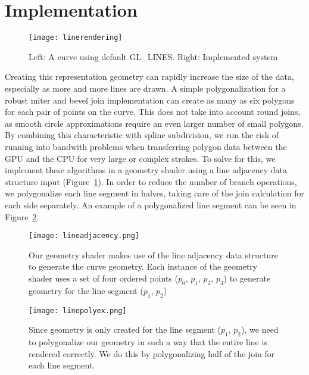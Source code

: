 \section{Implementation}

\begin{figure}
\texttt{[image: linerendering]}
\caption{Left: A curve using default GL\_LINES. Right: Implemented system}
\end{figure}

Creating this representation geometry can rapidly increase the size of the data, especially as more and more lines are drawn. 
A simple polygonalization for a robust miter and bevel join implementation can create as many as six polygons for each pair of points on the curve.
This does not take into account round joins, as smooth circle approximations require an even larger number of small polygons.
By combining this characteristic with spline subdivision, we run the risk of running into bandwith problems when transferring polygon data between the GPU and the CPU for very large or complex strokes.
To solve for this, we implement these algorithms in a geometry shader using a line adjacency data structure input (Figure~\ref{fig:lineadjacency}).
In order to reduce the number of branch operations, we polygonalize each line segment in halves, taking care of the join calculation for each side separately.
An example of a polygonalized line segment can be seen in Figure~\ref{fig:linepoly}.

\begin{figure}
	\begin{center}
		\texttt{[image: lineadjacency.png]}
	\end{center}
	\caption[Line Adjacency data structure]{Our geometry shader makes use of the line adjacency data structure to generate the curve geometry. Each instance of the geometry shader uses a set of four ordered points ($p_0$, $p_1$, $p_2$, $p_3$) to generate geometry for the line segment ($p_1$, $p_2$)}
	\label{fig:lineadjacency}
\end{figure}
\begin{figure}

	\texttt{[image: linepolyex.png]}
	\caption[Example polygonization of a line with miter joins.] {Since geometry is only created for the line segment ($p_1$, $p_2$), we need to polygonalize our geometry in such a way that the entire line is rendered correctly. We do this by polygonalizing half of the join for each line segment.}
	\label{fig:linepoly}
\end{figure}




